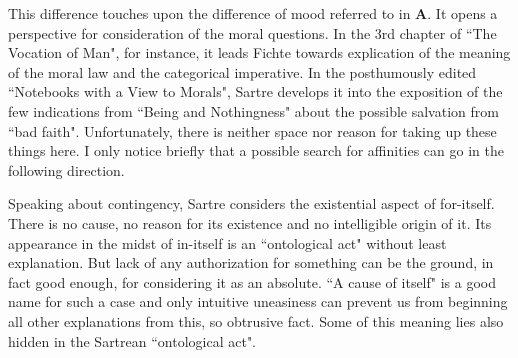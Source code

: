 This difference touches upon the difference of mood referred to in {\bf A}. It opens a perspective for consideration of the moral 
questions. In the 3rd chapter of ``The Vocation of Man", for instance, it leads Fichte towards explication of the 
meaning of the moral law and the categorical imperative. In the posthumously edited ``Notebooks with a View to 
Morals", Sartre develops it into the exposition of the few indications from ``Being and Nothingness" about the 
possible salvation from ``bad faith". Unfortunately, there is neither space nor reason for taking up these things 
here. I only notice briefly that a possible search for affinities can go in the following direction.

Speaking about contingency, Sartre considers the existential aspect of for-itself. There is no cause, no reason for 
its existence and no intelligible origin of it. Its appearance in the midst of in-itself is an ``ontological act" without 
least explanation. But lack of any authorization for something can be the ground, in fact good enough, for 
considering it as an absolute. ``A cause of itself" is a good name for such a case and only intuitive uneasiness can 
prevent us from beginning all other explanations from this, so obtrusive fact. Some of this meaning lies also 
hidden in the Sartrean ``ontological act".


